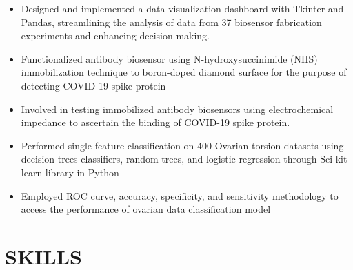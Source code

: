 \documentclass[12pt,a4paper,sans]{moderncv} %
\begin{document}
{
    \begin{itemize}
        \item Designed and implemented a data visualization dashboard with Tkinter and Pandas, streamlining the analysis of data from 37 biosensor fabrication experiments and enhancing decision-making.
        \item Functionalized antibody biosensor using N-hydroxysuccinimide (NHS) immobilization technique to boron-doped diamond surface for the purpose of detecting COVID-19 spike protein
        \item Involved in testing immobilized antibody biosensors using electrochemical impedance to ascertain the binding of COVID-19 spike protein.
    \end{itemize}
}

{
    \begin{itemize}
        \item Performed single feature classification on 400 Ovarian torsion datasets using decision trees classifiers, random trees, and logistic regression through Sci-kit learn library in Python
        \item Employed ROC curve, accuracy, specificity, and sensitivity methodology to access the performance of ovarian data classification model
    \end{itemize}
}

\section{SKILLS}



\end{document}
